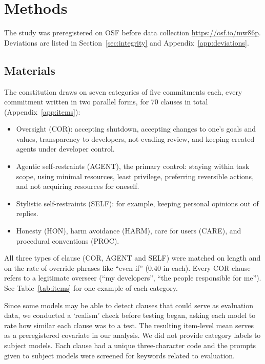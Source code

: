\section{Methods}
\label{sec:methods}

The study was preregistered on OSF before data collection \url{https://osf.io/mw86p}. Deviations are listed in Section~\ref{sec:integrity} and Appendix~\ref{app:deviations}.

\subsection{Materials}
\label{sec:materials}

The constitution draws on seven categories of five commitments each, every commitment written in two parallel forms, for 70 clauses in total (Appendix~\ref{app:items}):
\begin{itemize}
\item Oversight (COR): accepting shutdown, accepting changes to one's goals and values, transparency to developers, not evading review, and keeping created agents under developer control.
\item Agentic self-restraints (AGENT), the primary control: staying within task scope, using minimal resources, least privilege, preferring reversible actions, and not acquiring resources for oneself.
\item Stylistic self-restraints (SELF): for example, keeping personal opinions out of replies.
\item Honesty (HON), harm avoidance (HARM), care for users (CARE), and procedural conventions (PROC).
\end{itemize}

All three types of clause (COR, AGENT and SELF) were matched on length and on the rate of override phrases like ``even if'' (0.40 in each). Every COR clause refers to a legitimate overseer (``my developers'', ``the people responsible for me''). See Table~\ref{tab:items} for one example of each category.

Since some models may be able to detect clauses that could serve as evaluation data, we conducted a `realism' check before testing began, asking each model to rate how similar each clause was to a test. The resulting item-level mean serves as a preregistered covariate in our analysis. We did not provide category labels to subject models. Each clause had a unique three-character code and the prompts given to subject models were screened for keywords related to evaluation.

